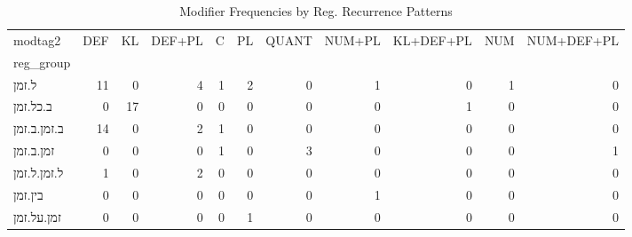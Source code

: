 \begin{table}[htbp!]
\centering
\caption{Modifier Frequencies by Reg. Recurrence Patterns}
\label{table:regrecmod_ct}
\begin{adjustbox}{width=1\textwidth}
\begin{tabular}{lrrrrrrrrrr}
\toprule
modtag2 &  DEF &  KL &  DEF+PL &  C &  PL &  QUANT &  NUM+PL &  KL+DEF+PL &  NUM &  NUM+DEF+PL \\
reg\_group   &      &     &         &    &     &        &         &            &      &             \\
\midrule
ל.זמן       &   11 &   0 &       4 &  1 &   2 &      0 &       1 &          0 &    1 &           0 \\
ב.כל.זמן    &    0 &  17 &       0 &  0 &   0 &      0 &       0 &          1 &    0 &           0 \\
ב.זמן.ב.זמן &   14 &   0 &       2 &  1 &   0 &      0 &       0 &          0 &    0 &           0 \\
זמן.ב.זמן   &    0 &   0 &       0 &  1 &   0 &      3 &       0 &          0 &    0 &           1 \\
ל.זמן.ל.זמן &    1 &   0 &       2 &  0 &   0 &      0 &       0 &          0 &    0 &           0 \\
בין.זמן     &    0 &   0 &       0 &  0 &   0 &      0 &       1 &          0 &    0 &           0 \\
זמן.על.זמן  &    0 &   0 &       0 &  0 &   1 &      0 &       0 &          0 &    0 &           0 \\
\bottomrule
\end{tabular}
\end{adjustbox}
\end{table}
